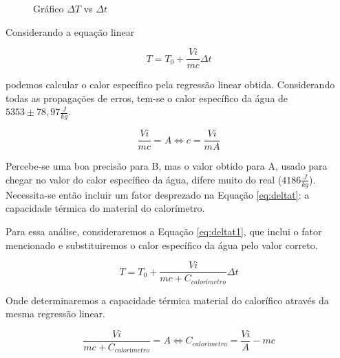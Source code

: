 \begin{figure} [htbp!]
    \centering
    \caption{Gráfico $\Delta T$ vs $\Delta t$}
    \label{fig:grafico1}
\end{figure}

Considerando a equação linear

\begin{equation} \label{eq:deltat}
    \boxed{T=T_0+\frac{Vi}{mc}\Delta t}
\end{equation}

\noindent podemos calcular o calor específico pela regressão linear obtida. Considerando todas as propagações de erros, tem-se o calor específico da água de $5353 \pm 78,97\frac{J}{kg}$.

\begin{equation}
    \boxed{\frac{Vi}{mc}=A \Leftrightarrow c=\frac{Vi}{mA}}
\end{equation}

Percebe-se uma boa precisão para B, mas o valor obtido para A, usado para chegar no valor do calor específico da água, difere muito do real ($4186\frac{J}{kg}$). Necessita-se então incluir um fator desprezado na Equação \ref{eq:deltat}: a capacidade térmica do material do calorímetro.

Para essa análise, consideraremos a Equação \ref{eq:deltat1}, que inclui o fator mencionado e substituiremos o calor específico da água pelo valor correto.

\begin{equation} \label{eq:deltat1}
    \boxed{T=T_0+\frac{Vi}{mc+C_{calorímetro}}\Delta t}
\end{equation}

Onde determinaremos a capacidade térmica material do calorífico através da mesma regressão linear.

\begin{equation}
    \boxed{\frac{Vi}{mc+C_{calorímetro}}=A \Leftrightarrow C_{calorímetro}=\frac{Vi}{A}-mc}
\end{equation}

